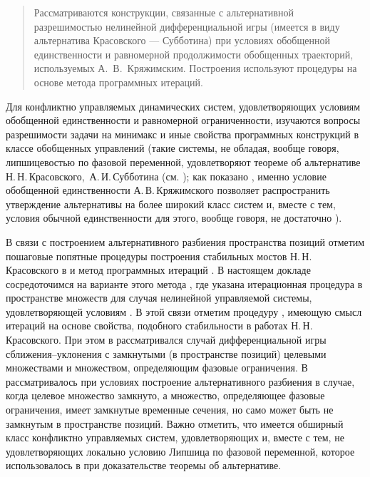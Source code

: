 \begin{abstract}
Рассматриваются конструкции, связанные с альтернативной разрешимостью нелинейной дифференциальной игры (имеется в виду альтернатива Красовского --- Субботина) при условиях обобщенной единственности и равномерной продолжимости обобщенных траекторий, используемых А.\, В.\, Кряжимским.
Построения используют процедуры на основе метода программных итераций.

\end{abstract}

Для конфликтно управляемых динамических систем, удовлетворяющих условиям обобщенной единственности и равномерной ограниченности, изучаются вопросы разрешимости задачи на ми\-ни\-макс и иные свойства программных конструкций в классе обобщенных управлений (такие системы, не обладая, вообще говоря, липшицевостью по фазовой переменной, удовлетворяют теореме об альтернативе Н.\,Н.\,Кра\-сов\-ско\-го,\ А.\,И.\,Суб\-бо\-ти\-на (см. \cite{KraSub70PMM,KraSub74});
как показано \cite{Kry78}, именно условие обобщенной единственности А.\,В.\,Кряжимского позволяет распространить утверждение альтернативы на более широкий класс систем и, вместе с тем, условия обычной единственности для этого, вообще говоря, не достаточно \cite{KryDOK}).

В связи с построением альтернативного разбиения пространства позиций отметим пошаговые попятные процедуры построения стабильных мостов Н.\,Н.\,Красовского в \cite{Ushak1980} и метод программных итераций \cite{Chentsov76DAN226,Chentsov2021DU}.
В настоящем докладе сосредоточимся на варианте этого метода \cite[п.\,8]{Chentsov2021DU}, где указана итерационная процедура в пространстве множеств для случая нелинейной управляемой системы, удовлетворяющей условиям \cite{Kry78}.
В этой связи отметим процедуру \cite{ChentsovIMI2017}, имеющую смысл итераций на основе свойства, подобного стабильности в работах Н.\,Н.\,Красовского.
При этом в \cite{KraSub70PMM,KraSub74} рассматривался случай дифференциальной игры сближения--уклонения с замкнутыми (в пространстве позиций) целевыми множествами и множеством, определяющим фазовые ограничения.
В \cite{Chentsov2021DU,ChentsovIMI2017} рассматривалось при условиях \cite{Kry78} построение альтернативного разбиения в случае, когда целевое множество замкнуто, а множество, определяющее фазовые ограничения, имеет замкнутые временные сечения, но само может быть не замкнутым в пространстве позиций.
Важно отметить, что имеется обширный класс конфликтно управляемых систем, удовлетворяющих \cite{Kry78,KryDOK} и, вместе с тем, не удовлетворяющих локально условию Липшица по фазовой переменной, которое использовалось в \cite{KraSub70PMM,KraSub74} при доказательстве теоремы об альтернативе.


